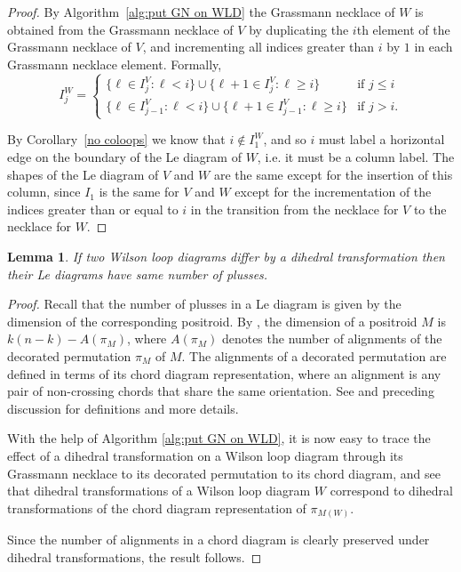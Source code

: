 \documentclass[11pt]{article}
\newtheorem{lem}[thm]{Lemma}
\theoremstyle{remark}
\theoremstyle{definition}
\begin{document}
\begin{proof}
  By Algorithm~\ref{alg:put GN on WLD} the Grassmann necklace of $W$ is obtained from the Grassmann necklace of $V$ by duplicating the $i$th element of the Grassmann necklace of $V$, and incrementing all indices greater than $i$ by $1$ in each Grassmann necklace element.  Formally, 
  \[
  I_j^{W} =
  \begin{cases}
    \{\ell \in I_j^{V} : \ell < i\} \cup \{\ell+1 \in I_j^{V} : \ell \geq i\} & \text{if $j\leq i$} \\
    \{\ell \in I_{j-1}^{V} : \ell < i\} \cup \{\ell+1 \in I_{j-1}^{V} : \ell \geq i\} & \text{if $j > i$.}
  \end{cases}
  \]


By Corollary~\ref{no coloops} we know that $i \not\in I_1^W$, and so $i$ must label a horizontal edge on the boundary of the Le diagram of $W$, i.e. it must be a column label. The shapes of the Le diagram of $V$ and $W$ are the same except for the insertion of this column, since $I_1$ is the same for $V$ and $W$ except for the incrementation of the indices  greater than or equal to $i$ in the transition from the necklace for $V$ to the necklace for $W$.   
\end{proof}
\vspace{0.5em}

\begin{lem}\label{lem dihedral}
If two Wilson loop diagrams differ by a dihedral transformation then their Le diagrams have same number of plusses.
\end{lem}
\begin{proof}
Recall that the number of plusses in a Le diagram is given by the dimension of the corresponding positroid. By \cite[Proposition 17.10]{Postnikov}, the dimension of a positroid $M$ is $k(n-k) - A(\pi_M)$, where $A(\pi_M)$ denotes the number of alignments of the decorated permutation $\pi_M$ of $M$. The alignments of a decorated permutation are defined in terms of its chord diagram representation, where an alignment is any pair of non-crossing chords that share the same orientation. See \cite[Figure 17.1]{Postnikov} and preceding discussion for definitions and more details.

With the help of Algorithm \ref{alg:put GN on WLD}, it is now easy to trace the effect of a dihedral transformation on a Wilson loop diagram through its Grassmann necklace to its decorated permutation to its chord diagram, and see that dihedral transformations of a Wilson loop diagram $W$ correspond to dihedral transformations of the chord diagram representation of $\pi_{M(W)}$. 

Since the number of alignments in a chord diagram is clearly preserved under dihedral transformations, the result follows.
\end{proof}
\end{document}
